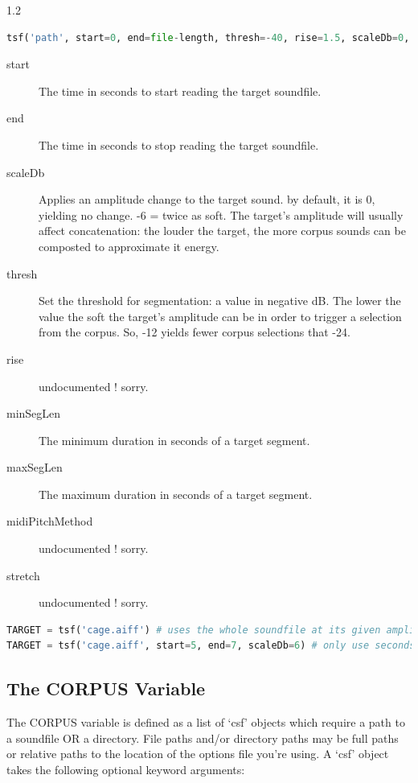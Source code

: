 \documentclass{article}
\begin{document}
\begin{spacing}{1.2}
\begin{lstlisting}[language=python]
tsf('path', start=0, end=file-length, thresh=-40, rise=1.5, scaleDb=0, minSegLen=0.05, maxSegLen=1000, midiPitchMethod='composite', stretch=1)
\end{lstlisting}

\begin{description}
\item[start] The time in seconds to start reading the target soundfile.
\item[end] The time in seconds to stop reading the target soundfile.  
\item[scaleDb] Applies an amplitude change to the target sound. by default, it is 0, yielding no change. -6 = twice as soft.  The target's amplitude will usually affect concatenation: the louder the target, the more corpus sounds can be composted to approximate it energy.
\item[thresh] Set the threshold for segmentation: a value in negative dB.  The lower the value the soft the target's amplitude can be in order to trigger a selection from the corpus.  So, -12 yields fewer corpus selections that -24.
\item[rise] undocumented !  sorry.
\item[minSegLen] The minimum duration in seconds of a target segment.
\item[maxSegLen] The maximum duration in seconds of a target segment.
\item[midiPitchMethod] undocumented !  sorry.
\item[stretch] undocumented !  sorry.
\end{description}

\begin{lstlisting}[language=python]
TARGET = tsf('cage.aiff') # uses the whole soundfile at its given amplitude
TARGET = tsf('cage.aiff', start=5, end=7, scaleDb=6) # only use seconds 5-7 of cage.aiff at double the amplitude.
\end{lstlisting}


\subsection{The CORPUS Variable}
The CORPUS variable is defined as a list of `csf' objects which require a path to a soundfile OR a directory.  File paths and/or directory paths may be full paths or relative paths to the location of the options file you're using.  A `csf' object takes the following optional keyword arguments:


\end{spacing}
\end{document}

